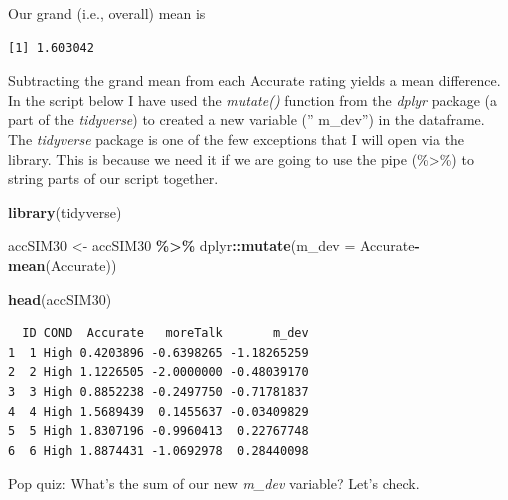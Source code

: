 \documentclass[
  11pt,
]{book}
\newenvironment{Shaded}{\begin{snugshade}}{\end{snugshade}}
\newcommand{\AttributeTok}[1]{\textcolor[rgb]{0.27,0.27,0.27}{#1}}
\newcommand{\FunctionTok}[1]{\textcolor[rgb]{0.27,0.27,0.27}{\textbf{#1}}}
\newcommand{\NormalTok}[1]{#1}
\newcommand{\OtherTok}[1]{\textcolor[rgb]{0.37,0.37,0.37}{#1}}
\newcommand{\SpecialCharTok}[1]{\textcolor[rgb]{0.43,0.43,0.43}{\textbf{#1}}}
\begin{document}
Our grand (i.e., overall) mean is

\begin{Shaded}
\end{Shaded}

\begin{verbatim}
[1] 1.603042
\end{verbatim}

Subtracting the grand mean from each Accurate rating yields a mean difference. In the script below I have used the \emph{mutate()} function from the \emph{dplyr} package (a part of the \emph{tidyverse}) to created a new variable ('' m\_dev'') in the dataframe. The \emph{tidyverse} package is one of the few exceptions that I will open via the library. This is because we need it if we are going to use the pipe (\%\textgreater\%) to string parts of our script together.

\begin{Shaded}
\begin{Highlighting}[]
\FunctionTok{library}\NormalTok{(tidyverse)}

\NormalTok{accSIM30 }\OtherTok{\textless{}{-}}\NormalTok{ accSIM30 }\SpecialCharTok{\%\textgreater{}\%} 
\NormalTok{  dplyr}\SpecialCharTok{::}\FunctionTok{mutate}\NormalTok{(}\AttributeTok{m\_dev =}\NormalTok{ Accurate}\SpecialCharTok{{-}}\FunctionTok{mean}\NormalTok{(Accurate))}

\FunctionTok{head}\NormalTok{(accSIM30)}
\end{Highlighting}
\end{Shaded}

\begin{verbatim}
  ID COND  Accurate   moreTalk       m_dev
1  1 High 0.4203896 -0.6398265 -1.18265259
2  2 High 1.1226505 -2.0000000 -0.48039170
3  3 High 0.8852238 -0.2497750 -0.71781837
4  4 High 1.5689439  0.1455637 -0.03409829
5  5 High 1.8307196 -0.9960413  0.22767748
6  6 High 1.8874431 -1.0692978  0.28440098
\end{verbatim}

Pop quiz: What's the sum of our new \emph{m\_dev} variable? Let's check.

\begin{Shaded}
\end{Shaded}
\end{document}
